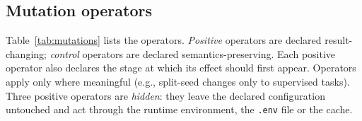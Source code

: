 \documentclass[11pt]{article}
\begin{document}
\begin{table}[t]
\centering\small
\caption{Baseline experiments (28). Each model is run on two data variants.}
\label{tab:experiments}
\end{table}

\subsection{Mutation operators}

Table~\ref{tab:mutations} lists the operators. \emph{Positive} operators are declared result-changing; \emph{control} operators are declared semantics-preserving. Each positive operator also declares the stage at which its effect should first appear. Operators apply only where meaningful (e.g., split-seed changes only to supervised tasks). Three positive operators are \emph{hidden}: they leave the declared configuration untouched and act through the runtime environment, the \texttt{.env} file or the cache.
\end{document}
